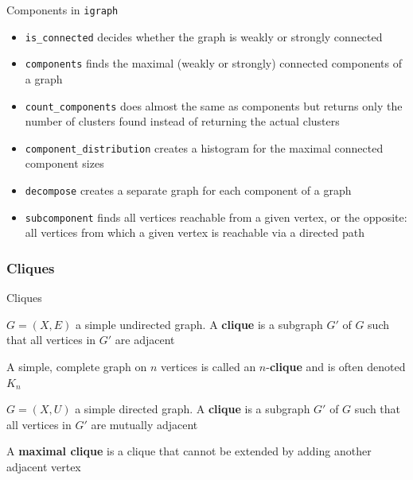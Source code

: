 \documentclass[aspectratio=43]{beamer}
\begin{document}
\begin{frame}{Components in {\tt igraph}}
\begin{itemize}
	\item {\tt is\_connected} decides whether the graph is weakly or strongly connected
	\item {\tt components} finds the maximal (weakly or strongly) connected components of a graph
	\item {\tt count\_components} does almost the same as components but returns only the number of clusters found instead of returning the actual clusters
	\item {\tt component\_distribution} creates a histogram for the maximal connected component sizes
	\item {\tt decompose} creates a separate graph for each component of a graph
	\item {\tt subcomponent} finds all vertices reachable from a given vertex, or the opposite: all vertices from which a given vertex is reachable via a directed path
\end{itemize}
\end{frame}
	
\subsubsection{Cliques}

\begin{frame}{Cliques}
	\begin{definition}
		$G=(X,E)$ a simple undirected graph. A \textbf{clique} is a subgraph $G'$ of $G$ such that all vertices in $G'$ are adjacent
	\end{definition}
	\begin{definition}[$n$-clique]
		A simple, complete graph on $n$ vertices is called an $n$-\textbf{clique} and is often denoted $K_n$
	\end{definition}
	\begin{definition}
		$G=(X,U)$ a simple directed graph. A \textbf{clique} is a subgraph $G'$ of $G$ such that all vertices in $G'$ are mutually adjacent
	\end{definition}
	\begin{definition}
		A \textbf{maximal clique} is a clique that cannot be extended by adding another adjacent vertex
	\end{definition}
\end{frame}
\end{document}
